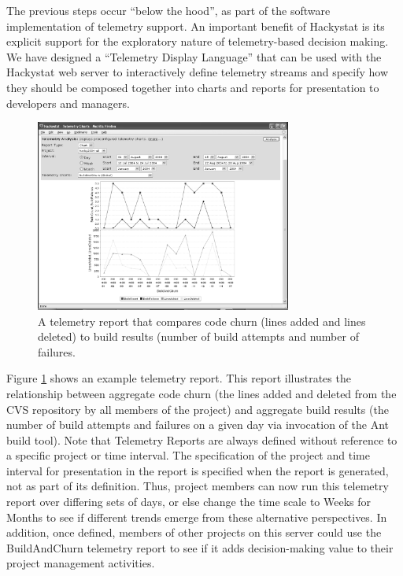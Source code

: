 \documentclass[11pt,twocolumn]{article}
\begin{document}
The previous steps occur ``below the hood'', as part of the software
implementation of telemetry support.  An important benefit of Hackystat is
its explicit support for the exploratory nature of telemetry-based decision
making.  We have designed a ``Telemetry Display Language'' that can
be used with the Hackystat web server to interactively define telemetry
streams and specify how they should be composed together into charts and
reports for presentation to developers and managers.

\begin{figure}[ht]
  \centering
  \includegraphics[width=0.75\textwidth]{BuildAndChurn.eps}
  \caption{A telemetry report that compares code churn (lines
  added and lines deleted) to build results (number of build attempts and
  number of failures.} 
  \label{fig:telemetryreport}
\end{figure}

Figure \ref{fig:telemetryreport} shows an example telemetry report.  This
report illustrates the relationship between aggregate code churn (the lines
added and deleted from the CVS repository by all members of the project)
and aggregate build results (the number of build attempts and failures on a
given day via invocation of the Ant build tool).  Note that Telemetry
Reports are always defined without reference to a specific project or time
interval.  The specification of the project and time interval for
presentation in the report is specified when the report is generated, not
as part of its definition.  Thus, project members can now run this
telemetry report over differing sets of days, or else change the time scale
to Weeks for Months to see if different trends emerge from these
alternative perspectives.  In addition, once defined, members of other
projects on this server could use the BuildAndChurn telemetry report to see
if it adds decision-making value to their project management activities.
\end{document}
